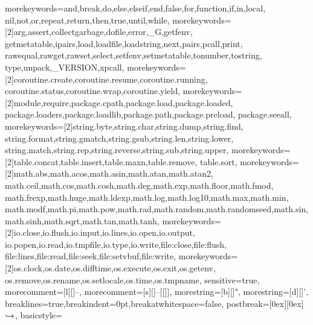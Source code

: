 
  {morekeywords={and,break,do,else,elseif,end,false,for,function,if,in,local,
     nil,not,or,repeat,return,then,true,until,while},
   morekeywords={[2]arg,assert,collectgarbage,dofile,error,_G,getfenv,
     getmetatable,ipairs,load,loadfile,loadstring,next,pairs,pcall,print,
     rawequal,rawget,rawset,select,setfenv,setmetatable,tonumber,tostring,
     type,unpack,_VERSION,xpcall},
   morekeywords={[2]coroutine.create,coroutine.resume,coroutine.running,
     coroutine.status,coroutine.wrap,coroutine.yield},
   morekeywords={[2]module,require,package.cpath,package.load,package.loaded,
     package.loaders,package.loadlib,package.path,package.preload,
     package.seeall},
   morekeywords={[2]string.byte,string.char,string.dump,string.find,
     string.format,string.gmatch,string.gsub,string.len,string.lower,
     string.match,string.rep,string.reverse,string.sub,string.upper},
   morekeywords={[2]table.concat,table.insert,table.maxn,table.remove,
   table.sort},
   morekeywords={[2]math.abs,math.acos,math.asin,math.atan,math.atan2,
     math.ceil,math.cos,math.cosh,math.deg,math.exp,math.floor,math.fmod,
     math.frexp,math.huge,math.ldexp,math.log,math.log10,math.max,math.min,
     math.modf,math.pi,math.pow,math.rad,math.random,math.randomseed,math.sin,
     math.sinh,math.sqrt,math.tan,math.tanh},
   morekeywords={[2]io.close,io.flush,io.input,io.lines,io.open,io.output,
     io.popen,io.read,io.tmpfile,io.type,io.write,file:close,file:flush,
     file:lines,file:read,file:seek,file:setvbuf,file:write},
   morekeywords={[2]os.clock,os.date,os.difftime,os.execute,os.exit,os.getenv,
     os.remove,os.rename,os.setlocale,os.time,os.tmpname},
   sensitive=true,
   morecomment=[l][\color{Magenta}]{--},
   morecomment=[s][\color{Magenta}]{--[[}{]]},
   morestring=[b][\color{Blue}]",
   morestring=[d][\color{Blue}]',
   breaklines=true,breakindent=0pt,breakatwhitespace=false,
   postbreak=\raisebox{0ex}[0ex][0ex]{\ensuremath{\color{black}\hookrightarrow\space}},
   basicstyle=\ttfamily\small
}


